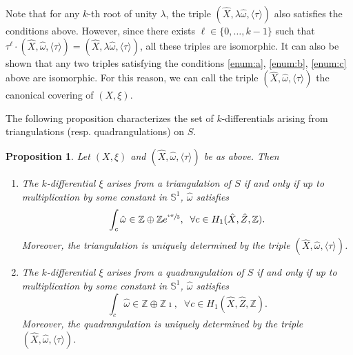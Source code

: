 \documentclass[11pt]{article}
\newcommand{\resp}{resp.\xspace}
\numberwithin{equation}{section}
\newenvironment{enumeratei}
{\bgroup\def\theenumi{\roman{enumi}}\def\theenumii{\arabic{enumii}}\begin{enumerate}}
{\end{enumerate}\egroup}
\theoremstyle{plain}
\newtheorem{Proposition}[Theorem]{Proposition}
\theoremstyle{definition}
\newcommand\Z{\mathbb{Z}}
\renewcommand{\S}{\mathbb{S}}
\newcommand{\hX}{\hat{X}}
\newcommand{\homg}{\hat{\omega}}
\begin{document}
Note that for any $k$-th root of unity $\lambda$, the triple $(\hX, \lambda\homg,\langle \tau\rangle)$ also satisfies the conditions above. However, since there exists $\ell \in \{0,\dots,k-1\}$ such that $\tau^\ell\cdot(\hX,\homg,\langle \tau\rangle)=(\hX, \lambda\homg,\langle \tau\rangle)$, all these triples are isomorphic. It can also be shown that any two triples satisfying the conditions \eqref{enum:a}, \eqref{enum:b}, \eqref{enum:c} above are isomorphic.
For this reason, we can call the triple $(\hX,\homg,\langle\tau\rangle)$ the canonical covering of $(X,\xi)$.

The following proposition characterizes the set of $k$-differentials arising from triangulations (\resp quadrangulations) on $S$.
\begin{Proposition}\label{prop:reg:tiled:surface}
Let $(X,\xi)$ and $(\hX,\homg,\langle \tau \rangle)$ be as above. Then
\begin{enumeratei}
\item
The $k$-differential $\xi$ arises from a triangulation of $S$ if and only if up to multiplication by some constant in $\S^1$, $\homg$ satisfies
\begin{equation}\label{eq:cond:kdiff:triang}
\int_c\hat{\omega} \in \Z\oplus\Z e^{\sfrac{\imath\pi}{3}}, \; \; \forall c\in H_1(\hat{X},\hat{Z},\Z).
\end{equation}
Moreover, the triangulation is uniquely determined by the triple $(\hat{X},\hat{\omega},\langle\tau\rangle)$.

\item
The $k$-differential $\xi$ arises from a quadrangulation of $S$ if and only if up to multiplication by some constant in $\S^1$, $\homg$ satisfies
\begin{equation}\label{eq:cond:kdiff:quad}
\int_c\hat{\omega} \in \Z\oplus\Z\imath, \; \; \forall c\in H_1(\hat{X},\hat{Z},\Z).
\end{equation}
Moreover, the quadrangulation is uniquely determined by the triple $(\hat{X},\hat{\omega},\langle\tau\rangle)$.
\end{enumeratei}
\end{Proposition}
\end{document}
